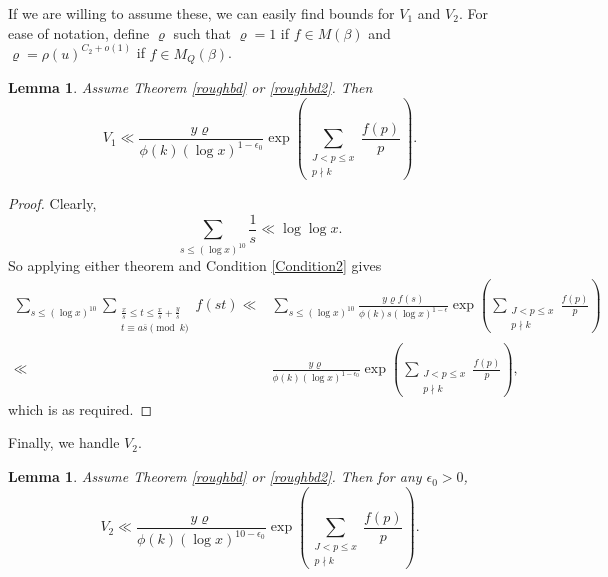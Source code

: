 \documentclass{amsart}
\newtheorem{lemma}[theorem]{Lemma}
\begin{document}
If we are willing to assume these, we can easily find bounds for $V_1$ and $V_2$.  For ease of notation, define $\varrho$ such that $\varrho=1$ if $f\in M(\beta)$ and $\varrho=\rho(u)^{C_2+o(1)}$ if $f\in M_Q(\beta)$.

\begin{lemma}
Assume Theorem \ref{roughbd} or \ref{roughbd2}.  Then
$$V_1\ll \frac{y\varrho}{\phi(k)(\log x)^{1-\epsilon_0}}\exp\left(\sum_{\substack{J<p\leq x \\ p\nmid k}}\frac{f(p)}{p}\right).$$
\end{lemma}
\begin{proof}
Clearly, 
$$\sum_{s\leq (\log x)^{10}}\frac 1s\ll \log\log x.$$
So applying either theorem and Condition \ref{Condition2} gives
\begin{align*}
\sum_{s\leq (\log x)^{10}}\sum_{\substack{\frac xs\leq t\leq \frac xs+\frac ys \\ t\equiv a\overline{s}\pmod k}}f(st)\ll & \sum_{s\leq (\log x)^{10}}\frac{y\varrho f(s)}{\phi(k)s(\log x)^{1-\epsilon}}\exp\left(\sum_{\substack{J<p\leq x \\ p\nmid k}}\frac{f(p)}{p}\right)\\
\ll & \frac{y\varrho }{\phi(k)(\log x)^{1-\epsilon_0}}\exp\left(\sum_{\substack{J<p\leq x \\ p\nmid k}}\frac{f(p)}{p}\right),
\end{align*}
which is as required.
\end{proof}
Finally, we handle $V_2$.
\begin{lemma}
Assume Theorem \ref{roughbd} or \ref{roughbd2}.  Then for any $\epsilon_0>0$,
$$V_2\ll \frac{y\varrho }{\phi(k)(\log x)^{10-\epsilon_0}}\exp\left(\sum_{\substack{J<p\leq x \\ p\nmid k}}\frac{f(p)}{p}\right).$$
\end{lemma}
\end{document}
